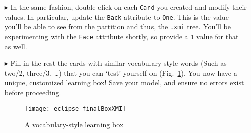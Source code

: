 \begin{itemize}
\item[$\blacktriangleright$] In the same fashion, double click on each \texttt{Card} you created and modify their values. In particular, update the
\texttt{Back} attribute to \texttt{One}. This is the value you'll be able to see from the partition and thus, the \texttt{.xmi} tree. You'll be experimenting
with the \texttt{Face} attribute shortly, so provide a \texttt{1} value for that as well.

\item[$\blacktriangleright$] Fill in the rest the cards with similar vocabulary-style words (Such as two/2, three/3, \ldots) that you can `test' yourself on
(Fig.~\ref{fig:finalXMI}).
You now have a unique, customized learning box! Save your model, and ensure no errors exist before proceeding.

\begin{figure}[htbp]
	\centering
  \texttt{[image: eclipse\_finalBoxXMI]}
	\caption{A vocabulary-style learning box}
	\label{fig:finalXMI}
\end{figure}

\end{itemize}
